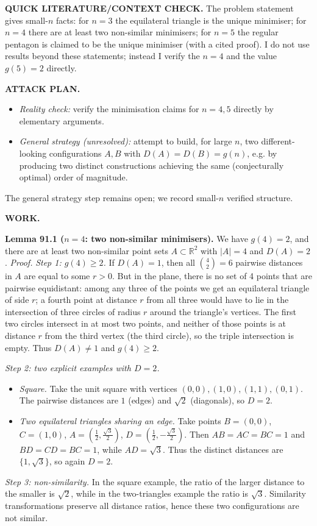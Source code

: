 \medskip
\noindent\textbf{QUICK LITERATURE/CONTEXT CHECK.}
The problem statement gives small-$n$ facts: for $n=3$ the equilateral triangle is the unique minimiser; for $n=4$ there are at least two non-similar minimisers; for $n=5$ the regular pentagon is claimed to be the unique minimiser (with a cited proof). I do not use results beyond these statements; instead I verify the $n=4$ and the value $g(5)=2$ directly.

\medskip
\noindent\textbf{ATTACK PLAN.}
\begin{itemize}
\item \emph{Reality check:} verify the minimisation claims for $n=4,5$ directly by elementary arguments.
\item \emph{General strategy (unresolved):} attempt to build, for large $n$, two different-looking configurations $A,B$ with $D(A)=D(B)=g(n)$, e.g. by producing two distinct constructions achieving the same (conjecturally optimal) order of magnitude.
\end{itemize}
The general strategy step remains open; we record small-$n$ verified structure.

\medskip
\noindent\textbf{WORK.}

\smallskip
\noindent\textbf{Lemma 91.1 ($n=4$: two non-similar minimisers).}
We have $g(4)=2$, and there are at least two non-similar point sets $A\subset\mathbb{R}^2$ with $|A|=4$ and $D(A)=2$.
\textit{Proof.}
\emph{Step 1: $g(4)\ge 2$.} If $D(A)=1$, then all $\binom{4}{2}=6$ pairwise distances in $A$ are equal to some $r>0$. But in the plane, there is no set of 4 points that are pairwise equidistant: among any three of the points we get an equilateral triangle of side $r$; a fourth point at distance $r$ from all three would have to lie in the intersection of three circles of radius $r$ around the triangle's vertices. The first two circles intersect in at most two points, and neither of those points is at distance $r$ from the third vertex (the third circle), so the triple intersection is empty. Thus $D(A)\ne 1$ and $g(4)\ge 2$.

\emph{Step 2: two explicit examples with $D=2$.}
\begin{itemize}
\item \emph{Square.} Take the unit square with vertices $(0,0),(1,0),(1,1),(0,1)$. The pairwise distances are $1$ (edges) and $\sqrt2$ (diagonals), so $D=2$.
\item \emph{Two equilateral triangles sharing an edge.} Take points
$B=(0,0)$, $C=(1,0)$, $A=(\tfrac12,\tfrac{\sqrt3}{2})$, $D=(\tfrac12,-\tfrac{\sqrt3}{2})$.
Then $AB=AC=BC=1$ and $BD=CD=BC=1$, while $AD=\sqrt3$. Thus the distinct distances are $\{1,\sqrt3\}$, so again $D=2$.
\end{itemize}
\emph{Step 3: non-similarity.}
In the square example, the ratio of the larger distance to the smaller is $\sqrt2$, while in the two-triangles example the ratio is $\sqrt3$. Similarity transformations preserve all distance ratios, hence these two configurations are not similar.

